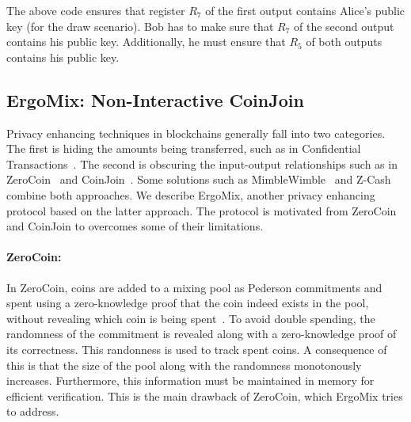 \documentclass[11pt]{article}
\newcommand{\mixname}{ErgoMix\xspace}
\begin{document}

The above code ensures that register $R_7$ of the first output contains Alice's public key (for the draw scenario). Bob has to make sure that $R_7$ of the second output contains his public key. Additionally, he must ensure that $R_5$ of both outputs contains his public key.

\subsection{\mixname: Non-Interactive CoinJoin}
\label{mix}

Privacy enhancing techniques in blockchains generally fall into two categories. The first is hiding the amounts being transferred, such as in Confidential Transactions~\cite{confidential}. The second is obscuring the input-output relationships such as in ZeroCoin~\cite{zerocoin} and CoinJoin~\cite{coinjoin}. Some solutions such as MimbleWimble~\cite{mw} and Z-Cash~\cite{zcash} combine both approaches. We describe \mixname, another privacy enhancing protocol based on the latter approach. The protocol is motivated from ZeroCoin and CoinJoin to overcomes some of their limitations.
 
\paragraph{ZeroCoin:}  In ZeroCoin, coins are added to a mixing pool as Pederson commitments and spent using a zero-knowledge proof that the coin indeed exists in the pool, without revealing which coin is being spent~\cite{zerocoin}. To avoid double spending, the randomness of the commitment is revealed along with a zero-knowledge proof of its correctness. This randonness is used to track spent coins. A consequence of this is that the size of the pool along with the randomness monotonously increases. Furthermore, this information must be maintained in memory for efficient verification. 
This is the main drawback of ZeroCoin, which \mixname tries to address. 

\end{document}
